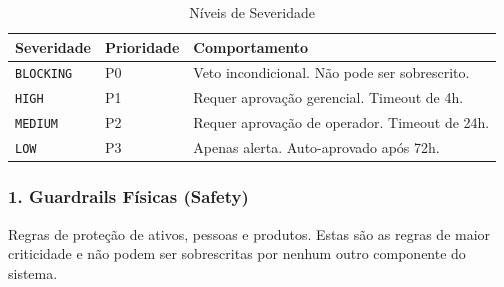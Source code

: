 \documentclass[12pt, a4paper]{article}
\begin{document}
\begin{table}[h!]
\centering
\small
\begin{tabular}{|l|l|p{8cm}|}
\hline
\textbf{Severidade} & \textbf{Prioridade} & \textbf{Comportamento} \\ \hline
\texttt{BLOCKING} & P0 & Veto incondicional. Não pode ser sobrescrito. \\ \hline
\texttt{HIGH} & P1 & Requer aprovação gerencial. Timeout de 4h. \\ \hline
\texttt{MEDIUM} & P2 & Requer aprovação de operador. Timeout de 24h. \\ \hline
\texttt{LOW} & P3 & Apenas alerta. Auto-aprovado após 72h. \\ \hline
\end{tabular}
\caption{Níveis de Severidade}
\end{table}

\subsubsection{1. Guardrails Físicas (Safety)}

Regras de proteção de ativos, pessoas e produtos. Estas são as regras de maior criticidade e não podem ser sobrescritas por nenhum outro componente do sistema.
\end{document}
